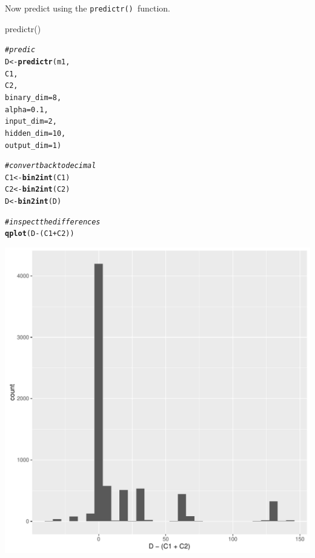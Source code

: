 \documentclass[british]{article}\usepackage[]{graphicx}\usepackage[]{color}
\makeatletter
\def\maxwidth{ %
  \ifdim\Gin@nat@width>\linewidth
    \linewidth
  \else
    \Gin@nat@width
  \fi
}
\newcommand{\hlnum}[1]{\textcolor[rgb]{0.686,0.059,0.569}{#1}}%
\newcommand{\hlcom}[1]{\textcolor[rgb]{0.678,0.584,0.686}{\textit{#1}}}%
\newcommand{\hlopt}[1]{\textcolor[rgb]{0,0,0}{#1}}%
\newcommand{\hlstd}[1]{\textcolor[rgb]{0.345,0.345,0.345}{#1}}%
\newcommand{\hlkwb}[1]{\textcolor[rgb]{0.69,0.353,0.396}{#1}}%
\newcommand{\hlkwc}[1]{\textcolor[rgb]{0.333,0.667,0.333}{#1}}%
\newcommand{\hlkwd}[1]{\textcolor[rgb]{0.737,0.353,0.396}{\textbf{#1}}}%
\newenvironment{kframe}{%
 \def\at@end@of@kframe{}%
 \ifinner\ifhmode%
  \def\at@end@of@kframe{\end{minipage}}%
  \begin{minipage}{\columnwidth}%
 \fi\fi%
 \def\FrameCommand##1{\hskip\@totalleftmargin \hskip-\fboxsep
 \colorbox{shadecolor}{##1}\hskip-\fboxsep
     \hskip-\linewidth \hskip-\@totalleftmargin \hskip\columnwidth}%
 \MakeFramed {\advance\hsize-\width
   \@totalleftmargin\z@ \linewidth\hsize
   \@setminipage}}%
 {\par\unskip\endMakeFramed%
 \at@end@of@kframe}
\newenvironment{knitrout}{}{} %
\newcommand{\code}[1]{\texttt{#1}}
\makeatother
\begin{document}
Now predict using the \code{predictr() }function.

\begin{table}[H]


\caption{predictr()}


\begin{knitrout}
\color{fgcolor}\begin{kframe}
\begin{alltt}
\hlcom{# predic}
\hlstd{D}  \hlkwb{<-} \hlkwd{predictr}\hlstd{(m1,}
               \hlstd{C1,}
               \hlstd{C2,}
               \hlkwc{binary_dim} \hlstd{=}  \hlnum{8}\hlstd{,}
               \hlkwc{alpha}      \hlstd{=}  \hlnum{0.1}\hlstd{,}
               \hlkwc{input_dim}  \hlstd{=}  \hlnum{2}\hlstd{,}
               \hlkwc{hidden_dim} \hlstd{=} \hlnum{10}\hlstd{,}
               \hlkwc{output_dim} \hlstd{=}  \hlnum{1}   \hlstd{)}

\hlcom{# convert back to decimal}
\hlstd{C1} \hlkwb{<-} \hlkwd{bin2int}\hlstd{(C1)}
\hlstd{C2} \hlkwb{<-} \hlkwd{bin2int}\hlstd{(C2)}
\hlstd{D}  \hlkwb{<-} \hlkwd{bin2int}\hlstd{(D)}

\hlcom{# inspect the differences               }
\hlkwd{qplot}\hlstd{( D}\hlopt{-}\hlstd{(C1}\hlopt{+}\hlstd{C2) )}
\end{alltt}


{\ttfamily\noindent\itshape\color{messagecolor}{\#\# `stat\_bin()` using `bins = 30`. Pick better value with `binwidth`.}}\end{kframe}
\includegraphics[width=\maxwidth]{figure/predictr-1} 

\end{knitrout}

\end{table}
\end{document}
